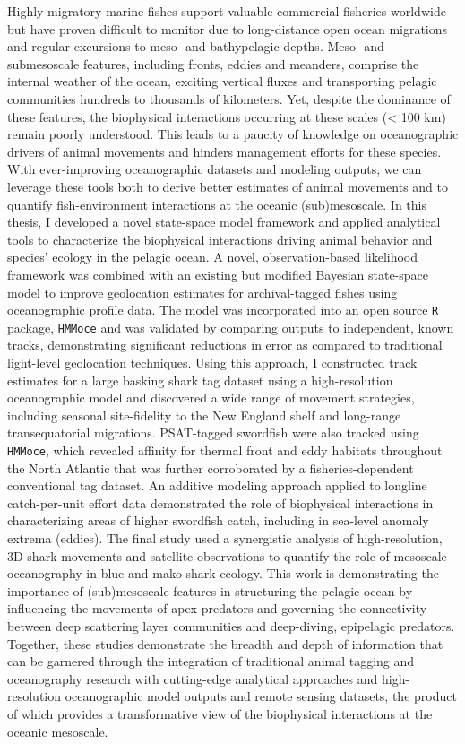 Highly migratory marine fishes support valuable commercial fisheries worldwide but have proven difficult to monitor due to long-distance open ocean migrations and regular excursions to meso- and bathypelagic depths. Meso- and submesoscale features, including fronts, eddies and meanders, comprise the internal weather of the ocean, exciting vertical fluxes and transporting pelagic communities hundreds to thousands of kilometers. Yet, despite the dominance of these features, the biophysical interactions occurring at these scales (< 100 km) remain poorly understood. This leads to a paucity of knowledge on oceanographic drivers of animal movements and hinders management efforts for these species. With ever-improving oceanographic datasets and modeling outputs, we can leverage these tools both to derive better estimates of animal movements and to quantify fish-environment interactions at the oceanic (sub)mesoscale. In this thesis, I developed a novel state-space model framework and applied analytical tools to characterize the biophysical interactions driving animal behavior and species' ecology in the pelagic ocean. A novel, observation-based likelihood framework was combined with an existing but modified Bayesian state-space model to improve geolocation estimates for archival-tagged fishes using oceanographic profile data. The model was incorporated into an open source \texttt{R} package, \texttt{HMMoce} and was validated by comparing outputs to independent, known tracks, demonstrating significant reductions in error as compared to traditional light-level geolocation techniques. Using this approach, I constructed track estimates for a large basking shark tag dataset using a high-resolution oceanographic model and discovered a wide range of movement strategies, including seasonal site-fidelity to the New England shelf and long-range transequatorial migrations. PSAT-tagged swordfish were also tracked using \texttt{HMMoce}, which revealed affinity for thermal front and eddy habitats throughout the North Atlantic that was further corroborated by a fisheries-dependent conventional tag dataset. An additive modeling approach applied to longline catch-per-unit effort data demonstrated the role of biophysical interactions in characterizing areas of higher swordfish catch, including in sea-level anomaly extrema (eddies). The final study used a synergistic analysis of high-resolution, 3D shark movements and satellite observations to quantify the role of mesoscale oceanography in blue and mako shark ecology. This work is demonstrating the importance of (sub)mesoscale features in structuring the pelagic ocean by influencing the movements of apex predators and governing the connectivity between deep scattering layer communities and deep-diving, epipelagic predators. Together, these studies demonstrate the breadth and depth of information that can be garnered through the integration of traditional animal tagging and oceanography research with cutting-edge analytical approaches and high-resolution oceanographic model outputs and remote sensing datasets, the product of which provides a transformative view of the biophysical interactions at the oceanic mesoscale.





